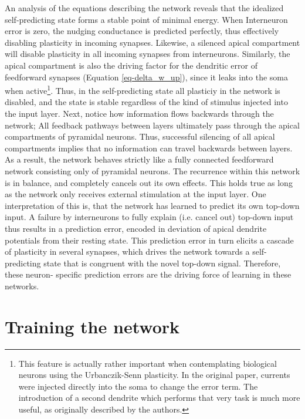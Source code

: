An analysis of the equations describing the network reveals that the idealized self-predicting state forms a stable
point of minimal energy. When Interneuron error is zero, the nudging conductance is predicted perfectly, thus
effectively disabling plasticity in incoming synapses. Likewise, a silenced apical compartment will disable plasticity
in all incoming synapses from interneurons. Similarly, the apical compartment is also the driving factor for the
dendritic error of feedforward synapses (Equation \ref{eq-delta_w_up}), since it leaks into the soma when
active\footnote{This feature is actually rather important when contemplating biological neurons using the Urbanczik-Senn
plasticity. In the original paper, currents were injected directly into the soma to change the error term. The
introduction of a second dendrite which performs that very task is much more useful, as originally described by the
authors.}. Thus, in the self-predicting state all plasticiy in the network is disabled, and the state is stable
regardless of the kind of stimulus injected into the input layer. Next, notice how information flows backwards through
the network; All feedback pathways between layers ultimately pass through the apical compartments of pyramidal neurons.
Thus, successful silencing of all apical compartments implies that no information can travel backwards between layers.
As a result, the network behaves strictly like a fully connected feedforward network consisting only of pyramidal
neurons. The recurrence within this network is in balance, and completely cancels out its own effects. This holds true
as long as the network only receives external stimulation at the input layer. One interpretation of this is, that the
network has learned to predict its own top-down input. A failure by interneurons to fully explain (i.e. cancel out)
top-down input thus results in a prediction error, encoded in deviation of apical dendrite potentials from their resting
state. This prediction error in turn elicits a cascade of plasticity in several synapses, which drives the network
towards a self-predicting state that is congruent with the novel top-down signal. Therefore, these neuron- specific
prediction errors are the driving force of learning in these networks.



\section{Training the network}

